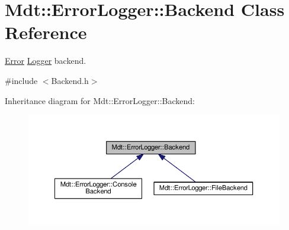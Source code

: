 \hypertarget{class_mdt_1_1_error_logger_1_1_backend}{}\section{Mdt\+:\+:Error\+Logger\+:\+:Backend Class Reference}
\label{class_mdt_1_1_error_logger_1_1_backend}


\hyperlink{class_mdt_1_1_error}{Error} \hyperlink{class_mdt_1_1_error_logger_1_1_logger}{Logger} backend.  




{\ttfamily \#include $<$Backend.\+h$>$}



Inheritance diagram for Mdt\+:\+:Error\+Logger\+:\+:Backend\+:
\nopagebreak
\begin{figure}[H]
\begin{center}
\leavevmode
\includegraphics[width=350pt]{class_mdt_1_1_error_logger_1_1_backend__inherit__graph}
\end{center}
\end{figure}
